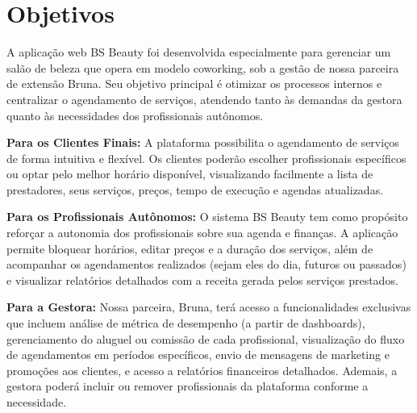 \section{Objetivos}

A aplicação web BS Beauty foi desenvolvida especialmente para gerenciar um salão de beleza que opera em modelo coworking, sob a gestão de nossa parceira de extensão Bruna. Seu objetivo principal é otimizar os processos internos e centralizar o agendamento de serviços, atendendo tanto às demandas da gestora quanto às necessidades dos profissionais autônomos.

\noindent\textbf{Para os Clientes Finais:} A plataforma possibilita o agendamento de serviços de forma intuitiva e flexível. Os clientes poderão escolher profissionais específicos ou optar pelo melhor horário disponível, visualizando facilmente a lista de prestadores, seus serviços, preços, tempo de execução e agendas atualizadas.

\noindent\textbf{Para os Profissionais Autônomos:} O sistema BS Beauty tem como propósito reforçar a autonomia dos profissionais sobre sua agenda e finanças. A aplicação permite bloquear horários, editar preços e a duração dos serviços, além de acompanhar os agendamentos realizados (sejam eles do dia, futuros ou passados) e visualizar relatórios detalhados com a receita gerada pelos serviços prestados.

\noindent\textbf{Para a Gestora:} Nossa parceira, Bruna, terá acesso a funcionalidades exclusivas que incluem análise de métrica de desempenho (a partir de dashboards), gerenciamento do aluguel ou comissão de cada profissional, visualização do fluxo de agendamentos em períodos específicos, envio de mensagens de marketing e promoções aos clientes, e acesso a relatórios financeiros detalhados. Ademais, a gestora poderá incluir ou remover profissionais da plataforma conforme a necessidade.
